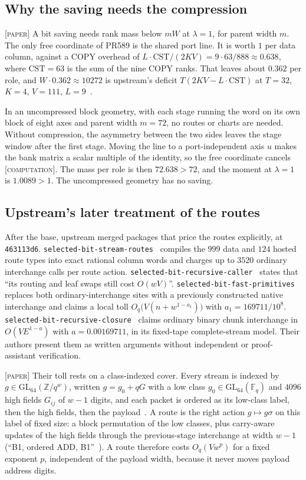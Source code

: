 \documentclass[11pt]{amsart}
\newcommand{\F}{\mathbb{F}}
\newcommand{\tagP}{\textsc{[paper]}}
\newcommand{\tagC}{\textsc{[computation]}}
\begin{document}
\subsection{Why the saving needs the compression}
\tagP{} A bit saving needs rank mass below $mW$ at $\lambda = 1$, for parent width $m$. The only
free coordinate of PR589 is the shared port line. It is worth $1$ per data column, against a COPY
overhead of $L \cdot \mathrm{CST}/(2KV) = 9 \cdot 63/888 \approx 0.638$, where $\mathrm{CST} = 63$
is the sum of the nine COPY ranks. That leaves about $0.362$ per role, and
$W \cdot 0.362 \approx 10272$ is upstream's deficit $T(2KV - L \cdot \mathrm{CST})$ at $T = 32$,
$K = 4$, $V = 111$, $L = 9$~\cite{TW}.

In an uncompressed block geometry, with each stage running the word on its own block of eight axes
and parent width $m = 72$, no routes or charts are needed. Without compression, the
asymmetry between the two sides leaves the stage window after the first stage. Moving the line to a
port-independent axis $u$ makes the bank matrix a scalar multiple of the identity, so the free
coordinate cancels \tagC. The mass per role is then $72.638 > 72$, and the moment at $\lambda = 1$
is $1.0089 > 1$. The uncompressed geometry has no saving.

\subsection{Upstream's later treatment of the routes}
After the base, upstream merged packages that price the routes explicitly, at
\texttt{463113d6}. \texttt{selected-bit-stream-routes}~\cite{SR} compiles the $999$ data and
$124$ hosted route types into exact rational column words and charges up to $3520$ ordinary
interchange calls per route action. \texttt{selected-bit-recursive-caller}~\cite{RCa} states that
``its routing and leaf swaps still cost $O(wV)$''.
\texttt{selected-bit-fast-primitives}~\cite{FP} replaces both ordinary-interchange sites with a
previously constructed native interchange and claims a local toll $O_q\bigl(V(n +
w^{1-a_1})\bigr)$ with $a_1 = 169711/10^8$. \texttt{selected-bit-recursive-closure}~\cite{RCl}
claims ordinary binary chunk interchange in $O(V E^{1-a})$ with $a = 0.00169711$, in its fixed-tape
complete-stream model. Their authors present them as written arguments without independent or
proof-assistant verification.

\tagP{} Their toll rests on a class-indexed cover. Every stream is indexed by $g \in
\mathrm{GL}_{64}(\mathbb{Z}/q^w)$, written $g = g_0 + qG$ with a low class $g_0 \in
\mathrm{GL}_{64}(\F_q)$ and $4096$ high fields $G_{ij}$ of $w-1$ digits, and each packet is ordered
as its low-class label, then the high fields, then the payload~\cite[PROOF.md \S1]{SR}. A route is
the right action $g \mapsto g\sigma$ on this label of fixed size: a block permutation of the low
classes, plus carry-aware updates of the high fields through the previous-stage interchange at width
$w-1$ (``B1, ordered ADD, B1''~\cite[PROOF.md \S4]{FP}). A route therefore costs $O_q(V w^p)$ for a
fixed exponent $p$, independent of the payload width, because it never moves payload address
digits.
\end{document}
